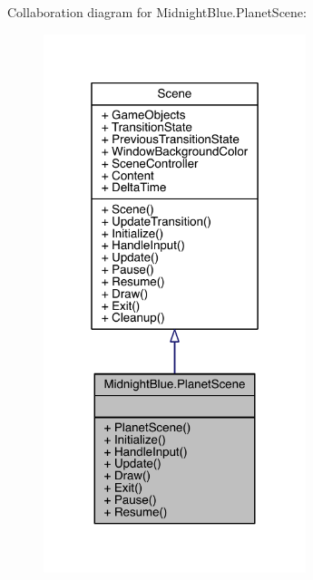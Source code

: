Collaboration diagram for Midnight\+Blue.\+Planet\+Scene\+:\nopagebreak
\begin{figure}[H]
\begin{center}
\leavevmode
\includegraphics[width=217pt]{class_midnight_blue_1_1_planet_scene__coll__graph}
\end{center}
\end{figure}
